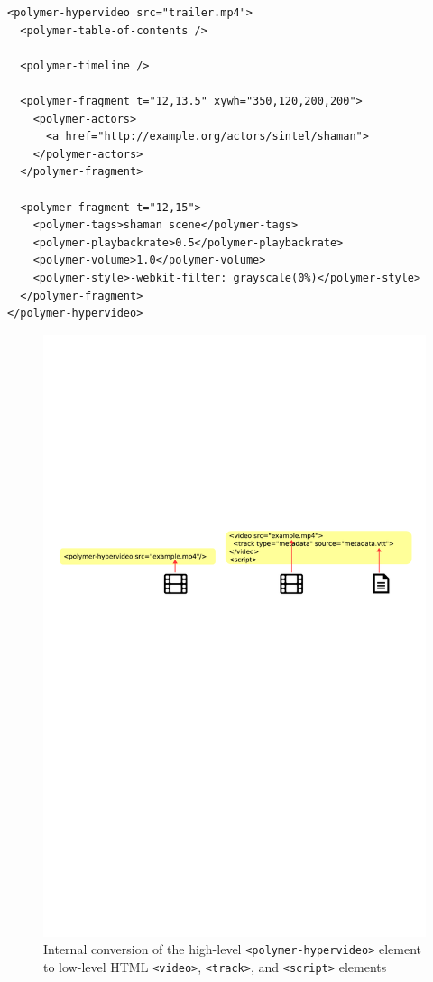 \documentclass[runningheads,a4paper]{llncs}
\begin{document}
\begin{lstlisting}[caption={Web Components markup of a~hypervideo
  (prefix ``polymer-'' used to distinguish custom elements from native elements)},
  label=listing:webcomponents, float=t!]
<polymer-hypervideo src="trailer.mp4">
  <polymer-table-of-contents />

  <polymer-timeline />

  <polymer-fragment t="12,13.5" xywh="350,120,200,200">
    <polymer-actors>
      <a href="http://example.org/actors/sintel/shaman">
    </polymer-actors>
  </polymer-fragment>

  <polymer-fragment t="12,15">
    <polymer-tags>shaman scene</polymer-tags>
    <polymer-playbackrate>0.5</polymer-playbackrate>
    <polymer-volume>1.0</polymer-volume>
    <polymer-style>-webkit-filter: grayscale(0%)</polymer-style>
  </polymer-fragment>
</polymer-hypervideo>
\end{lstlisting}
  
\begin{figure}[hbt]
  \centering
  \includegraphics[trim=0 73em 0 42em,width=\linewidth]{diagram}
  \caption{Internal conversion of the high-level \texttt{<polymer-hypervideo>}
    element to low-level HTML \texttt{<video>}, \texttt{<track>}, and \texttt{<script>}
    elements}
  \label{fig:diagram}
\end{figure}
\end{document}
